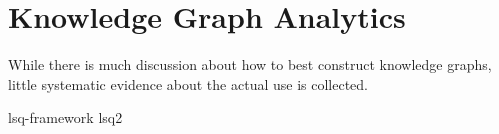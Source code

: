 \chapter{Knowledge Graph Analytics}
While there is much discussion about how to best construct knowledge graphs, little systematic evidence
about the actual use is collected.

%
%

{lsq-framework}
{lsq2}
